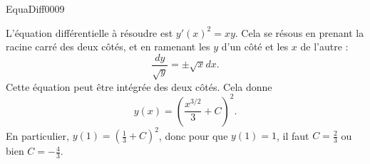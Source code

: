 \begin{corrige}{EquaDiff0009}

L'équation différentielle à résoudre est $y'(x)^2=xy$. Cela se résous en prenant la racine carré des deux côtés, et en ramenant les $y$ d'un côté et les $x$ de l'autre :
\begin{equation}
	\frac{ dy }{ \sqrt{y} }=\pm\sqrt{x}dx.
\end{equation}
Cette équation peut être intégrée des deux côtés. Cela donne
\begin{equation}
	y(x)=\left( \frac{ x^{3/2} }{ 3 }+C \right)^2.
\end{equation}
En particulier, $y(1)=\left( \frac{1}{ 3 }+C \right)^2$, donc pour que $y(1)=1$, il faut $C=\frac{ 2 }{ 3 }$ ou bien $C=-\frac{ 4 }{ 3 }$.

\end{corrige}
